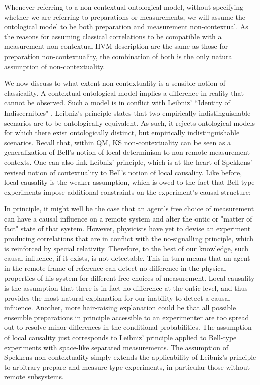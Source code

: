 Whenever referring to a non-contextual ontological model, without specifying whether we are referring to preparations or measurements, we  will assume the ontological model to be both preparation and measurement non-contextual. As the reasons for assuming classical correlations to be compatible with a measurement non-contextual HVM description are the same as those for preparation non-contextuality, the combination of both is the only natural assumption of non-contextuality.

We now discuss to what extent non-contextuality is a sensible notion of classicality. A contextual ontological model implies a difference in reality that cannot be observed. Such a model is in conflict with Leibniz' ``Identity of Indiscernibles" \cite{Buchanan2019,Spekkens2019}. Leibniz's principle states that two empirically indistinguishable scenarios are to be ontologically equivalent. As such, it rejects ontological models for which there exist ontologically distinct, but empirically indistinguishable scenarios. Recall that, within QM, KS non-contextuality can be seen as a generalization of Bell's notion of local determinism to non-remote measurement contexts. One can also link Leibniz' principle, which is at the heart of Spekkens' revised notion of contextuality to Bell's notion of local causality. Like before, local causality is the weaker assumption, which is owed to the fact that Bell-type experiments impose additional constraints on the experiment's causal structure:

In principle, it might well be the case that an agent's free choice of measurement can have a causal influence on a remote system and alter the ontic or "matter of fact" state of that system. However, physicists have yet to devise an experiment producing correlations that are in conflict with the no-signalling principle, which is reinforced by special relativity. Therefore, to the best of our knowledge, such causal influence, if it exists, is not detectable. This in turn means that an agent in the remote frame of reference can detect no difference in the physical properties of his system for different free choices of measurement. Local causality is the assumption that there is in fact no difference at the ontic level, and thus provides the most natural explanation for our inability to detect a causal influence. Another, more hair-raising explanation could be that all possible ensemble preparations in principle accessible to an experimenter are too spread out to resolve minor differences in the conditional probabilities. The assumption of local causality just corresponds to Leibniz' principle applied to Bell-type experiments with space-like separated measurements. The assumption of Spekkens non-contextuality simply extends the applicability of Leibniz's principle to arbitrary prepare-and-measure type experiments, in particular those without remote subsystems.

